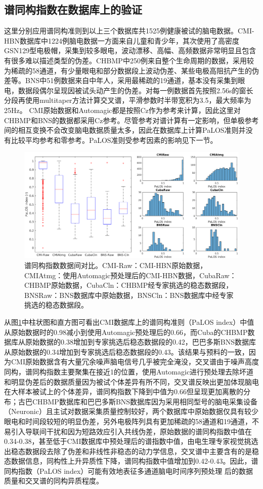 \subsection{谱同构指数在数据库上的验证}
这里分别应用谱同构准则到以上三个数据库共1525例健康被试的脑电数据。CMI-HBN数据库中1224例脑电数据一方面来自儿童和青少年，其次使用了高密度GSN129型电极帽，采集到较多眼电，波动漂移、高幅、高频数据非常明显且包含有很多难以描述类型的伪差。CHBMP中250例来自整个生命周期的数据，采用较为稀疏的58通道，有少量眼电和部分数据段上波动伪差、某些电极高阻抗产生的伪差等。BNS中51例数据来自中年人，采用最稀疏的19通道，基本没有采集到眼电，数据段偶尔呈现因被试头动产生的伪差。对每一例数据首先按照2.56s的窗长分段再使用multitaper方法计算交叉谱，平滑参数时半带宽积为3.5，最大频率为25Hz。 CMI原始数据和Automagic都是按照Cz作为参考来计算，因此这里对CHBMP和BNS的数据都采用Cz参考。尽管参考对谱计算有一定影响，但单极参考间的相互变换不会改变脑电数据质量太多，因此在数据库上计算PaLOS准则并没有比较平均参考和零参考。PaLOS准则受参考因素的影响见下一节。
\begin{figure}[!h]
	\includegraphics[width=15cm]{pic/palos/comparison.png}
	\caption{谱同构指数数据间对比。CMI-Raw：CMI-HBN原始数据，CMIAtmg：使用Automagic预处理后的CMI-HBN数据，CubaRaw：CHBMP原始数据，CubaCln：CHBMP经专家挑选的稳态数据段，BNSRaw：BNS数据库中原始数据，BNSCln：BNS数据库中经专家挑选的稳态数据段。}
	\label{5:comp}
\end{figure}

从图\ref{5:comp}中柱状图和直方图可看出CMI数据库上的谱同构准则（PaLOS index）中值从原始数据时的0.98减小到使用Automagic预处理后的0.66，而Cuba的CHBMP数据库从原始数据的0.38增加到专家挑选后稳态数据段的0.42，巴巴多斯BNS数据库从原始数据的0.34增加到专家挑选后稳态数据段的0.43。该结果与预料的一致，因为CMI原始数据含有大量冗余噪声脑电信号几乎被完全淹没，交叉谱由于噪声高度同构，谱同构指数主要聚集在接近1的位置，使用Automagic进行预处理去除坏道和明显伪差后的数据质量因为被试个体差异有所不同，交叉谱反映出更加体现脑电在大样本被试上的个体差异，谱同构指数下降到中值为0.66但呈现更加离散的分布；古巴CHBMP数据库和巴巴多斯BNS数据库因为采用相同型号的脑电采集设备（Neuronic）且主试对数据采集质量控制较好，两个数据库中原始数据仅具有较少眼电和时间段较短的明显伪差，另外电极阵列具有更加稀疏的58通道和19通道，不易引入导联间干扰和因为短路效应引入共线伪差，原始数据的谱同构指数中值在0.34-0.38，甚至低于CMI数据库中预处理后的谱指数中值，由电生理专家视觉挑选出稳态数据段去除了伪差和非线性非稳态的动力学信息，交叉谱中主要含有的是稳态数据信息，同构性上升异质性下降，谱同构指数中值增加到0.42-0.43。因此，谱同构指数（PaLOS index）可能有效地表征多通道脑电时间序列预处理
后的数据质量和交叉谱的同构异质程度。


